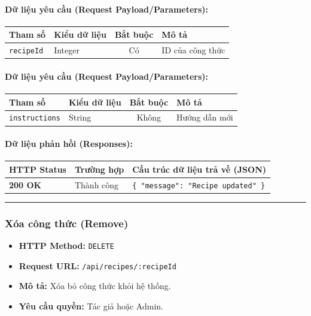 \documentclass[12pt,a4paper]{article}
\begin{document}
\paragraph{Dữ liệu yêu cầu (Request Payload/Parameters):}
\begin{longtable}{|>{\raggedright\arraybackslash}p{2.8cm}|>{\raggedright\arraybackslash}p{2.2cm}|c|>{\raggedright\arraybackslash}p{7.0cm}|}
\hline
\textbf{Tham số} & \textbf{Kiểu dữ liệu} & \textbf{Bắt buộc} & \textbf{Mô tả} \\ \hline
\endhead
\texttt{recipeId} & Integer & Có & ID của công thức \\ \hline
\end{longtable}

\paragraph{Dữ liệu yêu cầu (Request Payload/Parameters):}
\begin{longtable}{|>{\raggedright\arraybackslash}p{2.8cm}|>{\raggedright\arraybackslash}p{2.2cm}|c|>{\raggedright\arraybackslash}p{7.0cm}|}
\hline
\textbf{Tham số} & \textbf{Kiểu dữ liệu} & \textbf{Bắt buộc} & \textbf{Mô tả} \\ \hline
\endhead
\texttt{instructions} & String & Không & Hướng dẫn mới \\ \hline
\end{longtable}

\paragraph{Dữ liệu phản hồi (Responses):}
\begin{longtable}{|>{\raggedright\arraybackslash}p{2.8cm}|>{\raggedright\arraybackslash}p{3.2cm}|>{\raggedright\arraybackslash}p{8.0cm}|}
\hline
\textbf{HTTP Status} & \textbf{Trường hợp} & \textbf{Cấu trúc dữ liệu trả về (JSON)} \\ \hline
\endhead
\textbf{200 OK} & Thành công & \texttt{\{ "message": "Recipe updated" \}} \\ \hline
\end{longtable}

\vskip 0.4cm
\noindent\rule{\textwidth}{0.3pt}
\vskip 0.4cm

\subsubsection{Xóa công thức (Remove)}
\begin{itemize}[leftmargin=*]
    \item \textbf{HTTP Method:} \texttt{DELETE}
    \item \textbf{Request URL:} \texttt{/api/recipes/:recipeId}
    \item \textbf{Mô tả:} Xóa bỏ công thức khỏi hệ thống.
    \item \textbf{Yêu cầu quyền:} Tác giả hoặc Admin.
\end{itemize}
\end{document}
